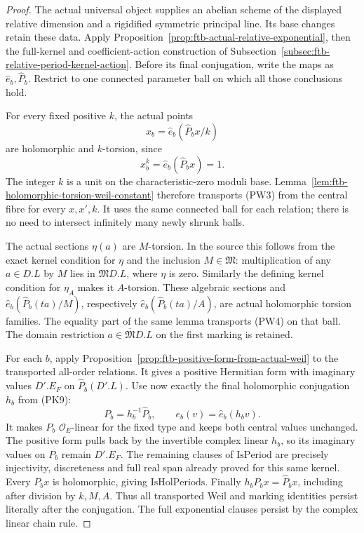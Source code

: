 \begin{proof}
The actual universal object supplies an abelian scheme
of the displayed relative dimension and a rigidified
symmetric principal line.
Its base changes retain these data.
Apply Proposition~\ref{prop:ftb-actual-relative-exponential},
then the full-kernel and coefficient-action construction
of Subsection~\ref{subsec:ftb-relative-period-kernel-action}.
Before its final conjugation, write the maps as
\(\widehat e_b,\widehat P_b\).
Restrict to one connected parameter ball on which all
those conclusions hold.

For every fixed positive \(k\), the actual points
\[
                       x_b=\widehat e_b(\widehat P_bx/k)
\]
are holomorphic and \(k\)-torsion, since
\[
 x_b^k=\widehat e_b(\widehat P_bx)=1.
\]
The integer \(k\) is a unit on the characteristic-zero
moduli base.
Lemma~\ref{lem:ftb-holomorphic-torsion-weil-constant}
therefore transports (PW3) from the central fibre for
every \(x,x',k\).
It uses the same connected ball for each relation;
there is no need to intersect infinitely many newly
shrunk balls.

The actual sections \(\eta(a)\) are \(M\)-torsion.
In the source this follows from the exact kernel
condition for \(\eta\) and the inclusion
\(M\in\mathfrak M\):
multiplication of any \(a\in D.L\) by \(M\) lies in
\(\mathfrak M D.L\), where \(\eta\) is zero.
Similarly the defining kernel condition for \(\eta_A\)
makes it \(A\)-torsion.
These algebraic sections and
\(\widehat e_b(\widehat P_b(ta)/M)\), respectively
\(\widehat e_b(\widehat P_b(ta)/A)\),
are actual holomorphic torsion families.
The equality part of the same lemma transports (PW4)
on that ball.
The domain restriction
\(a\in\overline{\mathfrak M}D.L\) on the first marking
is retained.

For each \(b\), apply
Proposition~\ref{prop:ftb-positive-form-from-actual-weil}
to the transported all-order relations.
It gives a positive Hermitian form with imaginary
values \(D'.E_F\) on \(\widehat P_b(D'.L)\).
Use now exactly the final holomorphic conjugation \(h_b\)
from (PK9):
\[
                   P_b=h_b^{-1}\widehat P_b,\qquad
                         e_b(v)=\widehat e_b(h_bv).
\]
It makes \(P_b\) \(\mathcal O_E\)-linear for the fixed
type and keeps both central values unchanged.
The positive form pulls back by the invertible complex
linear \(h_b\), so its imaginary values on \(P_b\)
remain \(D'.E_F\).
The remaining clauses of \(\mathrm{IsPeriod}\) are precisely
injectivity, discreteness and full real span already
proved for this same kernel.
Every \(P_bx\) is holomorphic, giving
\(\mathrm{IsHolPeriods}\).
Finally \(h_bP_bx=\widehat P_bx\), including after division
by \(k,M,A\).
Thus all transported Weil and marking identities persist
literally after the conjugation.
The full exponential clauses persist by the complex
linear chain rule.
\end{proof}

